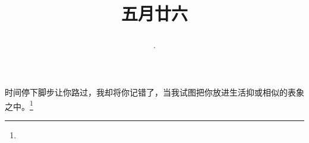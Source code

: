 \title{\date[d=1,m=7,y=2024][year:cn-y,年,month:cn,day:cn,日,·,weekday]·五月廿六 }
时间停下脚步让你路过，我却将你记错了，当我试图把你放进生活抑或相似的表象之中。\footnote{ }


